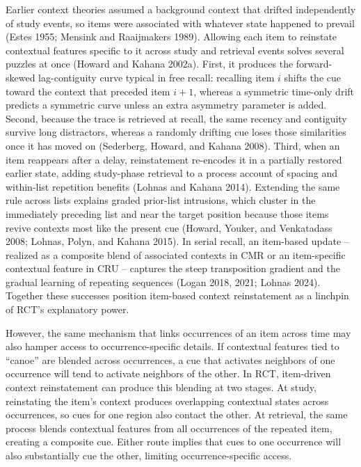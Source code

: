 \documentclass[
  letterpaper,
  11pt,
  english,
  singlespacing,
  headsepline]{MastersDoctoralThesis}
\begin{document}
Earlier context theories assumed a background context that drifted
independently of study events, so items were associated with whatever
state happened to prevail (Estes 1955; Mensink and Raaijmakers 1989).
Allowing each item to reinstate contextual features specific to it
across study and retrieval events solves several puzzles at once (Howard
and Kahana 2002a). First, it produces the forward-skewed lag-contiguity
curve typical in free recall: recalling item \(i\) shifts the cue toward
the context that preceded item \(i+1\), whereas a symmetric time-only
drift predicts a symmetric curve unless an extra asymmetry parameter is
added. Second, because the trace is retrieved at recall, the same
recency and contiguity survive long distractors, whereas a randomly
drifting cue loses those similarities once it has moved on (Sederberg,
Howard, and Kahana 2008). Third, when an item reappears after a delay,
reinstatement re-encodes it in a partially restored earlier state,
adding study-phase retrieval to a process account of spacing and
within-list repetition benefits (Lohnas and Kahana 2014). Extending the
same rule across lists explains graded prior-list intrusions, which
cluster in the immediately preceding list and near the target position
because those items revive contexts most like the present cue (Howard,
Youker, and Venkatadass 2008; Lohnas, Polyn, and Kahana 2015). In serial
recall, an item-based update -- realized as a composite blend of
associated contexts in CMR or an item-specific contextual feature in CRU
-- captures the steep transposition gradient and the gradual learning of
repeating sequences (Logan 2018, 2021; Lohnas 2024). Together these
successes position item-based context reinstatement as a linchpin of
RCT's explanatory power.

However, the same mechanism that links occurrences of an item across
time may also hamper access to occurrence-specific details. If
contextual features tied to ``canoe'' are blended across occurrences, a
cue that activates neighbors of one occurrence will tend to activate
neighbors of the other. In RCT, item-driven context reinstatement can
produce this blending at two stages. At study, reinstating the item's
context produces overlapping contextual states across occurrences, so
cues for one region also contact the other. At retrieval, the same
process blends contextual features from all occurrences of the repeated
item, creating a composite cue. Either route implies that cues to one
occurrence will also substantially cue the other, limiting
occurrence-specific access.
\end{document}
